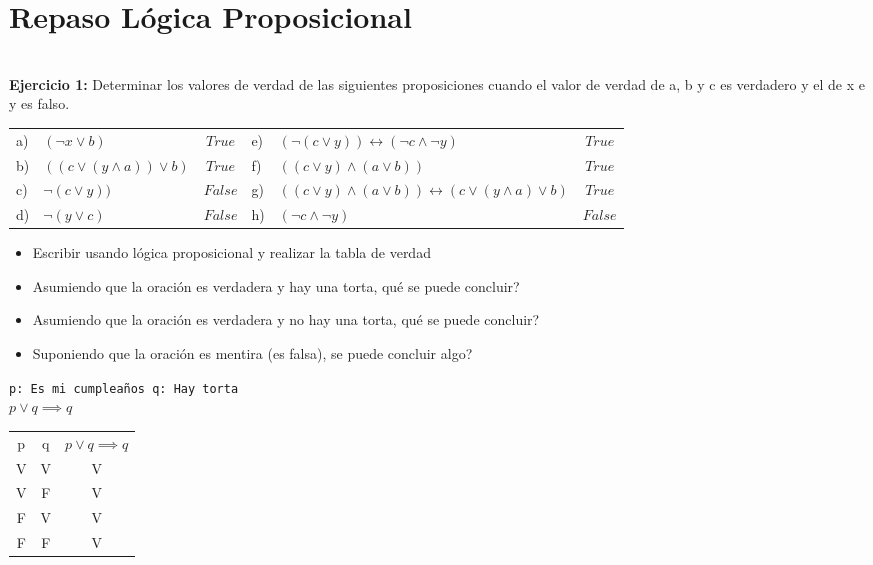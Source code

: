 \documentclass[10pt,a4paper,2in]{article}
\begin{document}
\section{Repaso Lógica Proposicional}
\hfill\\
\textbf{Ejercicio 1: }Determinar los valores de verdad de las siguientes proposiciones cuando el valor de verdad de a, b y c es verdadero y el de x e y es falso.\\
\begin{tabularx}{\textwidth}{|lX|c||lX|c|}
\hline
a)&$(\lnot x\lor b) $&$ True$& e) &$(\lnot(c\lor y))\leftrightarrow(\lnot c\land \lnot y)$&$True$\\
b)&$((c\lor (y\land a))\lor b)$&$ True$ & f)&$((c\lor y)\land(a\lor b))$&$True$\\
c)&$\lnot (c\lor y))$&$False$& g)&$((c\lor y)\land(a\lor b))\leftrightarrow (c\lor (y\land a)\lor b)$&$True$\\
d)&$\lnot(y\lor c)$&$False$&h) &$(\lnot c\land \lnot y)$&$False$\\
\hline
\end{tabularx}
\begin{itemize}
\item Escribir usando lógica proposicional y realizar la tabla de verdad
\item Asumiendo que la oración es verdadera y hay una torta, qué se puede concluir?
\item Asumiendo que la oración es verdadera y no hay una torta, qué se puede concluir?
\item Suponiendo que la oración es mentira (es falsa), se puede concluir algo?
\end{itemize}
\texttt{p: Es mi cumpleaños q: Hay torta}\\
$p\lor q \implies q$\\
\par\addvspace{\baselineskip}
\begin{center}
\begin{tabular}{|c|c|c|}
\hline
p&q&$p\lor q \implies q$\\
V&V&V\\
V&F&V\\
F&V&V\\
F&F&V\\
\hline
\end{tabular}\\
\end{center}
\par\addvspace{\baselineskip}
\end{document}
